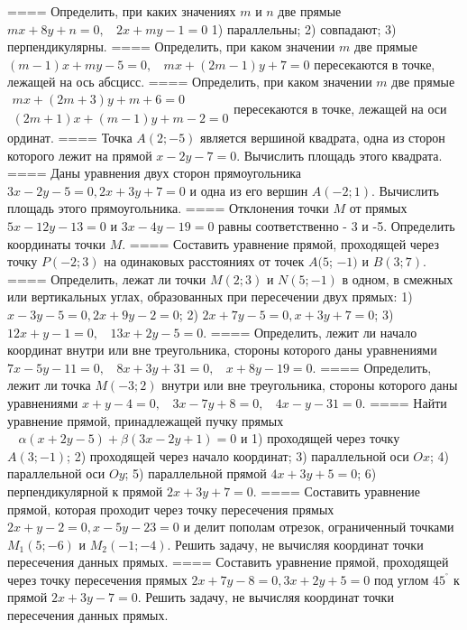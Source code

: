 ====
Определить, при каких значениях \(m\) и \(n\) две прямые \(mx + 8y + n = 0,\ \ \ \ 2x + my - 1 = 0\) 1) параллельны; 2) совпадают; 3) перпендикулярны.
====
Определить, при каком значении \(m\) две прямые \((m - 1)x + my - 5 = 0,\ \ \ \ mx + (2m - 1)y + 7 = 0\) пересекаются в точке, лежащей на ось абсцисс.
====
Определить, при каком значении \(m\) две прямые \(\begin{matrix}
mx + (2m + 3)y + m + 6 = 0 \\
(2m + 1)x + (m - 1)y + m - 2 = 0
\end{matrix}\)пересекаются в точке, лежащей на оси ординат.
====
Точка \(A(2; - 5)\) является вершиной квадрата, одна из сторон которого лежит на прямой \(x - 2y - 7 = 0\). Вычислить площадь этого квадрата.
====
Даны уравнения двух сторон прямоугольника \(3x - 2y - 5 = 0,2x + 3y + 7 = 0\) и одна из его вершин \(A( - 2;1)\). Вычислить площадь этого прямоугольника.
====
Отклонения точки \(M\) от прямых \(5x - 12y - 13 = 0\) и \(3x - 4y - 19 = 0\) равны соответственно - 3 и -5. Определить координаты точки \(M\).
====
Составить уравнение прямой, проходящей через точку \(P( - 2;3)\) на одинаковых расстояниях от точек \(A(5\); \(- 1)\) и \(B(3;7)\).
====
Определить, лежат ли точки \(M(2;3)\) и \(N(5; - 1)\) в одном, в смежных или вертикальных углах, образованных при пересечении двух прямых: 1) \(x - 3y - 5 = 0,2x + 9y - 2 = 0\); 2) \(2x + 7y - 5 = 0,x + 3y + 7 = 0\); 3) \(12x + y - 1 = 0,\ \ \ \ 13x + 2y - 5 = 0\).
====
Определить, лежит ли начало координат внутри или вне треугольника, стороны которого даны уравнениями \(7x - 5y - 11 = 0,\ \ \ \ 8x + 3y + 31 = 0,\ \ \ \ x + 8y - 19 = 0\).
====
Определить, лежит ли точка \(M( - 3;2)\) внутри или вне треугольника, стороны которого даны уравнениями \(x + y - 4 = 0,\ \ \ \ 3x - 7y + 8 = 0,\ \ \ \ 4x - y - 31 = 0\).
====
Найти уравнение прямой, принадлежащей пучку прямых \(\ \ \ \ \alpha(x + 2y - 5) + \beta(3x - 2y + 1) = 0\) и 1) проходящей через точку \(A(3; - 1)\); 2) проходящей через начало координат; 3) параллельной оси \(Ox\); 4) параллельной оси \(Oy\); 5) параллельной прямой \(4x + 3y + 5 = 0\); 6) перпендикулярной к прямой \(2x + 3y + 7 = 0\).
====
Составить уравнение прямой, которая проходит через точку пересечения прямых \(2x + y - 2 = 0,x - 5y - 23 = 0\) и делит пополам отрезок, ограниченный точками \(M_{1}(5; - 6)\) и \(M_{2}( - 1; - 4)\). Решить задачу, не вычисляя координат точки пересечения данных прямых.
====
Составить уравнение прямой, проходящей через точку пересечения прямых \(2x + 7y - 8 = 0,3x + 2y + 5 = 0\) под углом \(45^{{^\circ}}\) к прямой \(2x + 3y - 7 = 0\). Решить задачу, не вычисляя координат точки пересечения данных прямых.

